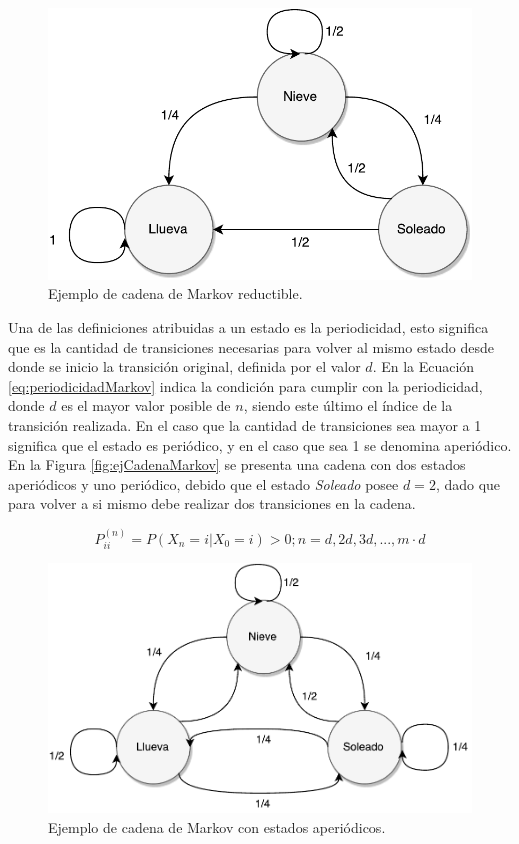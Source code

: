 \begin{figure}[ht!]
	\centering
	\includegraphics[scale=0.5]{images/EjCadenaMarkov-Reductible.pdf}
	\caption{Ejemplo de cadena de Markov reductible.}
	\label{fig:ejCadenaMarkov-Reductible}
\end{figure}

\normalsize{Una de las definiciones atribuidas a un estado es la periodicidad, esto significa que es la cantidad de transiciones necesarias para volver al mismo estado desde donde se inicio la transici\'on original, definida por el valor $d$. En la Ecuaci\'on} \ref{eq:periodicidadMarkov} \normalsize{indica la condici\'on para cumplir con la periodicidad, donde $d$ es el mayor valor posible de $n$, siendo este \'ultimo el \'indice de la transici\'on realizada. En el caso que la cantidad de transiciones sea mayor a 1 significa que el estado es peri\'odico, y en el caso que sea 1 se denomina aperi\'odico. En la Figura} \ref{fig:ejCadenaMarkov} \normalsize{se presenta una cadena con dos estados aperi\'odicos y uno peri\'odico, debido que el estado \textit{Soleado} posee $d=2$, dado que para volver a si mismo debe realizar dos transiciones en la cadena.}

\begin{equation} \label{eq:periodicidadMarkov}
	P_{ii}^{(n)} = P(X_n = i | X_0 = i) > 0 ; n = {d,2d,3d,..., m \cdot d}
\end{equation}

\begin{figure}[ht!]
	\centering
	\includegraphics[scale=0.5]{images/EjCadenaMarkov-Aperiodica.pdf}
	\caption{Ejemplo de cadena de Markov con estados aperi\'odicos.}
	\label{fig:ejCadenaMarkov-Aperiodica}
\end{figure}

